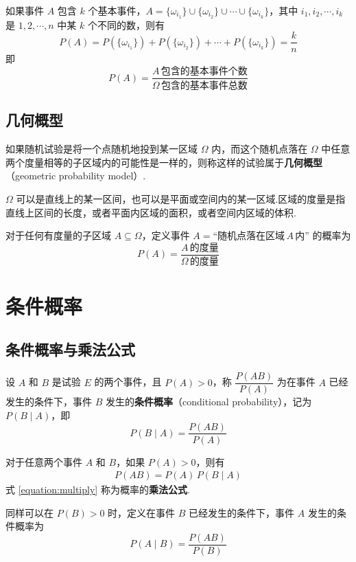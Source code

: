 如果事件 $A$ 包含 $k$ 个基本事件，$A=\{\omega_{i_1}\} \cup \{\omega_{i_2}\} \cup \cdots \cup \{\omega_{i_k}\}$，其中 $i_1,i_2,\cdots,i_k$ 是 $1,2,\cdots,n$ 中某 $k$ 个不同的数，则有
$$
P(A) = P(\{\omega_{i_1}\}) + P(\{\omega_{i_2}\}) + \cdots + P(\{\omega_{i_k}\}) = \dfrac{k}{n}
$$
即
$$
P(A)=\dfrac{A\,\text{包含的基本事件个数}}{\varOmega\,\text{包含的基本事件总数}}
$$

\subsection{几何概型}

如果随机试验是将一个点随机地投到某一区域 $\varOmega$ 内，而这个随机点落在 $\varOmega$ 中任意两个度量相等的子区域内的可能性是一样的，则称这样的试验属于\textbf{几何概型}（geometric probability model）.

\begin{note}
    $\varOmega$ 可以是直线上的某一区间，也可以是平面或空间内的某一区域.区域的度量是指直线上区间的长度，或者平面内区域的面积，或者空间内区域的体积.
\end{note}

对于任何有度量的子区域 $A \subseteq \varOmega$，定义事件 $A = \text{“随机点落在区域}\, A \,\text{内”}$ 的概率为
$$
P(A)=\dfrac{A\,\text{的度量}}{\varOmega\,\text{的度量}}
$$

\section{条件概率}

\subsection{条件概率与乘法公式}

\begin{definition}
    设 $A$ 和 $B$ 是试验 $E$ 的两个事件，且 $P(A)>0$，称 $\dfrac{P(AB)}{P(A)}$ 为在事件 $A$ 已经发生的条件下，事件 $B$ 发生的\textbf{条件概率}（conditional probability），记为 $P(B \mid A)$，即
    $$
    P(B \mid A)=\dfrac{P(AB)}{P(A)}
    $$
\end{definition}

对于任意两个事件 $A$ 和 $B$，如果 $P(A)>0$，则有
\begin{align} \label{equation:multiply}
    P(AB)=P(A) \, P(B \mid A)
\end{align}
式 \eqref{equation:multiply} 称为概率的\textbf{乘法公式}.

同样可以在 $P(B)>0$ 时，定义在事件 $B$ 已经发生的条件下，事件 $A$ 发生的条件概率为
$$
P(A \mid B)=\dfrac{P(AB)}{P(B)}
$$

